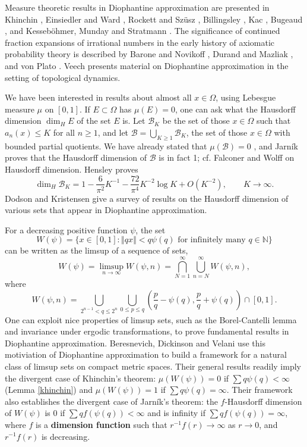 \documentclass{amsart}
\newcommand{\norm}[1]{\left\Vert #1 \right\Vert}
\begin{document}
 



Measure theoretic results in Diophantine approximation are presented in Khinchin \cite{MR1451873}, 
Einsiedler and Ward \cite[Chapter 3]{einsiedler},
Rockett and Sz\"usz \cite[Chapters V and VI]{rockett},   Billingsley \cite[pp.~13--15, 319--326]{billingsley},  Kac \cite[Chapter 5]{kac},  Bugeaud \cite{bugeaud}, and Kesseb\"ohmer,
Munday and Stratmann \cite{kessebohmer}.
The significance of continued fraction expansions of irrational numbers in the early history of axiomatic probability theory is described
by Barone and Novikoff \cite{barone}, Durand and Mazliak \cite{MR2859995}, and von Plato \cite{vonplato}.
Veech \cite{veech} presents material on Diophantine approximation in the setting of topological dynamics.

We have been interested in results about almost all $x \in \Omega$, using Lebesgue measure $\mu$ on $[0,1]$. If $E \subset \Omega$ has $\mu(E)=0$, one can 
ask what the Hausdorff dimension $\dim_H E$ of the set $E$ is. Let $\mathcal{B}_K$ be the set of those $x \in \Omega$ such that $a_n(x) \leq K$ for all
$n \geq 1$, and let $\mathcal{B} = \bigcup_{K \geq 1} \mathcal{B}_K$, the set of those $x \in \Omega$ with bounded partial quotients.
We have  already stated that $\mu(\mathcal{B})=0$ \cite[p.~60, Theorem 29]{MR1451873}, and Jarn\'ik  \cite[Theorem~4.3]{MR2112110} proves that
the Hausdorff dimension of $\mathcal{B}$ is in fact 1; cf. Falconer \cite[p.~155, Theorem 10.3]{falconer} and Wolff \cite[p.~67, Chapter 9]{wolff} on Hausdorff dimension.
Hensley \cite{hensley} proves 
\[
\dim_H \mathcal{B}_K = 1 - \frac{6}{\pi^2} K^{-1} - \frac{72}{\pi^4} K^{-2} \log K + O(K^{-2}),\qquad K \to \infty.
\]
Dodson and Kristensen \cite{MR2112110} give a survey of results on the Hausdorff dimension of various sets that
appear in Diophantine approximation.

For a decreasing positive function $\psi$, the set
\[
W(\psi) = \{ x \in [0,1] : \textrm{$\norm{qx} < q \psi(q)$ for infinitely many  $q \in \mathbb{N}$} \}
\]
can be written as the limsup of a sequence of sets, 
\[
W(\psi) = \limsup_{n \to \infty} W(\psi, n) = \bigcap_{N=1}^\infty \bigcup_{n=N}^\infty W(\psi,n),
\]
where 
\[
W(\psi, n) = \bigcup_{2^{n-1} < q \leq 2^n} \bigcup_{0\leq p \leq q} \left( \frac{p}{q} - \psi(q), \frac{p}{q} + \psi(q) \right) \cap [0,1].
\]
One can exploit nice properties of limsup sets, such as the Borel-Cantelli lemma and invariance under ergodic transformations, to prove fundamental results in Diophantine approximation.  Beresnevich, Dickinson and Velani \cite{limsup} use this motiviation of Diophantine approximation to build a framework for a natural class of limsup sets on compact metric spaces.  Their general results readily imply the divergent  case of  Khinchin's theorem: $\mu(W(\psi)) = 0$ if $\sum q \psi(q) < \infty$  (Lemma \ref{khinchin}) and 
$\mu(W(\psi)) = 1$ if $\sum q \psi(q) = \infty$.  Their framework also establishes the divergent case of Jarn\'ik's  theorem: the $f$-Hausdorff dimension of $W(\psi)$ is $0$ if $\sum q f(\psi(q)) < \infty$ and is infinity if $\sum q f(\psi(q)) = \infty$, where $f$ is a
\textbf{dimension function} such that $r^{-1} f(r) \to \infty$ as $r \to 0$, and $r^{-1} f(r)$ is decreasing.  
\end{document}
